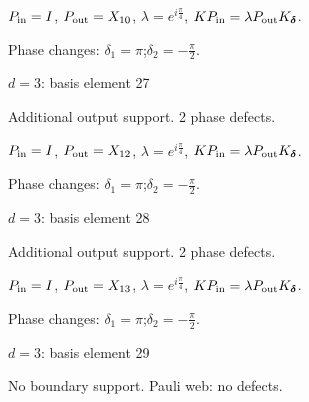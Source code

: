 $P_{\rm in}=I$, \quad $P_{\rm out}=X_{10}$, \quad $\lambda=e^{i\frac{\pi}{4}}$, \qquad $K P_{\rm in}=\lambda P_{\rm out}K_{\boldsymbol\delta}$.
\par\smallskip\begin{minipage}{.98\linewidth}\small Phase changes: $\delta_{1}=\pi$;\quad $\delta_{2}=-\frac{\pi}{2}$.\end{minipage}
\vfill
{\footnotesize\texttt{}}
\newpage
{}
{\Large $d=3$: basis element 27}\par
Additional output support. 2 phase defects.
\begin{center}
\end{center}
\vspace{-1mm}
$P_{\rm in}=I$, \quad $P_{\rm out}=X_{12}$, \quad $\lambda=e^{i\frac{\pi}{4}}$, \qquad $K P_{\rm in}=\lambda P_{\rm out}K_{\boldsymbol\delta}$.
\par\smallskip\begin{minipage}{.98\linewidth}\small Phase changes: $\delta_{1}=\pi$;\quad $\delta_{2}=-\frac{\pi}{2}$.\end{minipage}
\vfill
{\footnotesize\texttt{}}
\newpage
{}
{\Large $d=3$: basis element 28}\par
Additional output support. 2 phase defects.
\begin{center}
\end{center}
\vspace{-1mm}
$P_{\rm in}=I$, \quad $P_{\rm out}=X_{13}$, \quad $\lambda=e^{i\frac{\pi}{4}}$, \qquad $K P_{\rm in}=\lambda P_{\rm out}K_{\boldsymbol\delta}$.
\par\smallskip\begin{minipage}{.98\linewidth}\small Phase changes: $\delta_{1}=\pi$;\quad $\delta_{2}=-\frac{\pi}{2}$.\end{minipage}
\vfill
{\footnotesize\texttt{}}
\newpage
{}
{\Large $d=3$: basis element 29}\par
No boundary support. Pauli web: no defects.
\begin{center}
\end{center}
\vspace{-1mm}
